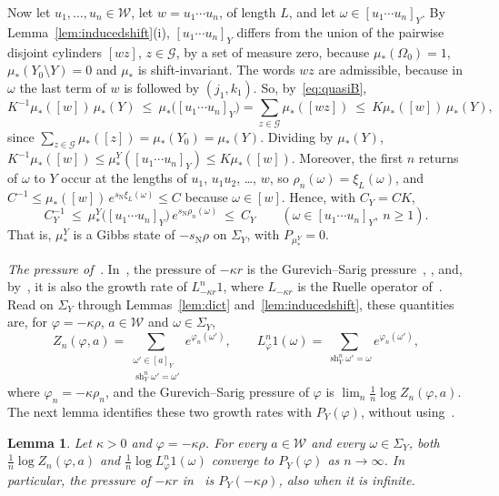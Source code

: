 \documentclass[11pt]{amsart}
\newtheorem{lemma}[proposition]{Lemma}
\theoremstyle{definition}
\theoremstyle{remark}
\newcommand{\sN}{s_{\mathrm N}}
\begin{document}
Now let $u_1,\dots,u_n\in\mathcal W$, let $w=u_1\cdots u_n$, of length $L$, and let $\omega\in[u_1\cdots u_n]_Y$. By Lemma~\ref{lem:inducedshift}(i), $[u_1\cdots u_n]_Y$ differs from the union of the pairwise disjoint cylinders $[wz]$, $z\in\mathcal G$, by a set of measure zero, because $\mu_*(\Omega_0)=1$, $\mu_*(Y_0\setminus Y)=0$ and $\mu_*$ is shift-invariant. The words $wz$ are admissible, because in $\omega$ the last term of $w$ is followed by $(j_1,k_1)$. So, by~\eqref{eq:quasiB},
\[
  K^{-1}\mu_*([w])\,\mu_*(Y)\ \le\ \mu_*\bigl([u_1\cdots u_n]_Y\bigr)=\sum_{z\in\mathcal G}\mu_*([wz])\ \le\ K\mu_*([w])\,\mu_*(Y),
\]
since $\sum_{z\in\mathcal G}\mu_*([z])=\mu_*(Y_0)=\mu_*(Y)$. Dividing by $\mu_*(Y)$, $K^{-1}\mu_*([w])\le\mu_*^Y([u_1\cdots u_n]_Y)\le K\mu_*([w])$. Moreover, the first $n$ returns of $\omega$ to $Y$ occur at the lengths of $u_1$, $u_1u_2$, \dots, $w$, so $\rho_n(\omega)=\xi_L(\omega)$, and $C^{-1}\le\mu_*([w])\,e^{\sN\xi_L(\omega)}\le C$ because $\omega\in[w]$. Hence, with $C_Y=CK$,
\begin{equation}\label{eq:gibbsY}
  C_Y^{-1}\ \le\ \mu_*^Y\bigl([u_1\cdots u_n]_Y\bigr)\,e^{\sN\rho_n(\omega)}\ \le\ C_Y\qquad(\omega\in[u_1\cdots u_n]_Y,\ n\ge1).
\end{equation}
That is, $\mu_*^Y$ is a Gibbs state of $-\sN\rho$ on $\Sigma_Y$, with $P_{\mu_*^Y}=0$.

\emph{The pressure of~\cite{AHSinv}.}
In~\cite{AHSinv}, the pressure of $-\kappa r$ is the Gurevich--Sarig pressure~\cite[Def.~15]{AHSinv}, \cite{Sar99}, and, by~\cite[Lemma~23]{AHSinv}, it is also the growth rate of $L^n_{-\kappa r}1$, where $L_{-\kappa r}$ is the Ruelle operator of~\cite[\S5.1]{AHSinv}. Read on $\Sigma_Y$ through Lemmas~\ref{lem:dict} and~\ref{lem:inducedshift}, these quantities are, for $\varphi=-\kappa\rho$, $a\in\mathcal W$ and $\omega\in\Sigma_Y$,
\[
  Z_n(\varphi,a)=\sum_{\substack{\omega'\in[a]_Y\\ \operatorname{sh}_Y^n\omega'=\omega'}}e^{\varphi_n(\omega')},\qquad
  L^n_\varphi1(\omega)=\sum_{\operatorname{sh}_Y^n\omega'=\omega}e^{\varphi_n(\omega')},
\]
where $\varphi_n=-\kappa\rho_n$, and the Gurevich--Sarig pressure of $\varphi$ is $\lim_n\frac1n\log Z_n(\varphi,a)$. The next lemma identifies these two growth rates with $P_Y(\varphi)$, without using~\cite{Sar99}.

\begin{lemma}\label{lem:gurevich}
Let $\kappa>0$ and $\varphi=-\kappa\rho$. For every $a\in\mathcal W$ and every $\omega\in\Sigma_Y$, both $\frac1n\log Z_n(\varphi,a)$ and $\frac1n\log L^n_\varphi1(\omega)$ converge to $P_Y(\varphi)$ as $n\to\infty$. In particular, the pressure of $-\kappa r$ in~\cite{AHSinv} is $P_Y(-\kappa\rho)$, also when it is infinite.
\end{lemma}
\end{document}
